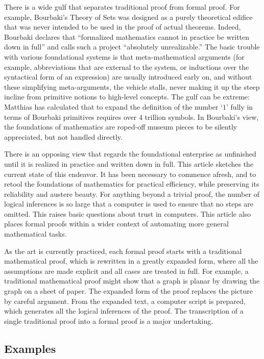 \documentclass{llncs}
\begin{document}
There is a wide gulf that separates traditional proof from formal proof.
For example, Bourbaki's Theory of Sets was designed as a purely theoretical
edifice that was never intended to be used in the proof of actual theorems.
Indeed, Bourbaki declares that ``formalized mathematics cannot
in practice be written down in full'' and calls such a project
``absolutely unrealizable.''  %
The basic trouble with various foundational systems is that meta-mathematical arguments (for
example, abbreviations that are external to the system, or
inductions over the syntactical form of an expression) 
are usually introduced early on, and without these simplifying meta-arguments,
the vehicle stalls, never making it up the steep incline from primitive notions to 
high-level concepts.   The gulf can be extreme: Matthias has calculated
that to expand the definition of the number `$1$' fully in terms of Bourbaki primitives requires
over $4$ trillion symbols.
In Bourbaki's view, 
the foundations of mathematics are roped-off museum pieces
to be silently appreciated, 
but not handled directly.

There is an opposing view that regards the 
foundational enterprise
as unfinished until it is realized in practice and written down in full.
This article sketches the current state of this endeavor.
It has been necessary to commence afresh, and to retool the foundations
of mathematics for practical efficiency, while preserving
its reliability and austere beauty.  For anything beyond a trivial
proof, the number of logical inferences is so large that a computer is
used to ensure that no steps are omitted.   This raises basic questions
about trust in computers.  This article also places formal proofs within
a wider context of automating more general mathematical tasks.

As the art is currently practiced, each formal proof starts with a traditional
mathematical proof, which is rewritten in a greatly expanded form, where all the
assumptions are made explicit and all cases are treated in full.
For example, a traditional mathematical proof might show that a graph is
planar by drawing the graph on a sheet of paper.  The expanded form of
the proof  replaces the picture by careful argument.  From the
expanded text, a computer script is prepared, which generates all
the logical inferences of the proof.  The transcription of a single traditional
proof into a formal proof is a major undertaking.

\subsection{Examples}
\end{document}
